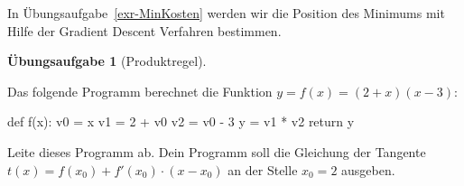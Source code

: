 \documentclass[
  a4paper,
  DIV=11]{scrreprt}
\newenvironment{Shaded}{\begin{snugshade}}{\end{snugshade}}
\newcommand{\ControlFlowTok}[1]{\textcolor[rgb]{0.00,0.23,0.31}{#1}}
\newcommand{\DecValTok}[1]{\textcolor[rgb]{0.68,0.00,0.00}{#1}}
\newcommand{\KeywordTok}[1]{\textcolor[rgb]{0.00,0.23,0.31}{#1}}
\newcommand{\NormalTok}[1]{\textcolor[rgb]{0.00,0.23,0.31}{#1}}
\newcommand{\OperatorTok}[1]{\textcolor[rgb]{0.37,0.37,0.37}{#1}}
\theoremstyle{definition}
\newtheorem{exercise}{Übungsaufgabe}[chapter]
\theoremstyle{definition}
\theoremstyle{remark}
\begin{document}
In Übungsaufgabe~\ref{exr-MinKosten} werden wir die Position des
Minimums mit Hilfe der Gradient Descent Verfahren bestimmen.

\begin{exercise}[Produktregel]\protect\hypertarget{exr-SADProduktregel}{}\label{exr-SADProduktregel}

Das folgende Programm berechnet die Funktion \(y = f(x) = (2+x)(x-3)\):

\begin{Shaded}
\begin{Highlighting}[]
\KeywordTok{def}\NormalTok{ f(x):}
\NormalTok{    v0 }\OperatorTok{=}\NormalTok{ x}
\NormalTok{    v1 }\OperatorTok{=} \DecValTok{2} \OperatorTok{+}\NormalTok{ v0}
\NormalTok{    v2 }\OperatorTok{=}\NormalTok{ v0 }\OperatorTok{{-}} \DecValTok{3}
\NormalTok{    y }\OperatorTok{=}\NormalTok{ v1 }\OperatorTok{*}\NormalTok{ v2}
    \ControlFlowTok{return}\NormalTok{ y}
\end{Highlighting}
\end{Shaded}

Leite dieses Programm ab. Dein Programm soll die Gleichung der Tangente
\(t(x) = f(x_0) + f'(x_0)\cdot (x-x_0)\) an der Stelle \(x_0 = 2\)
ausgeben.

\end{exercise}
\end{document}
